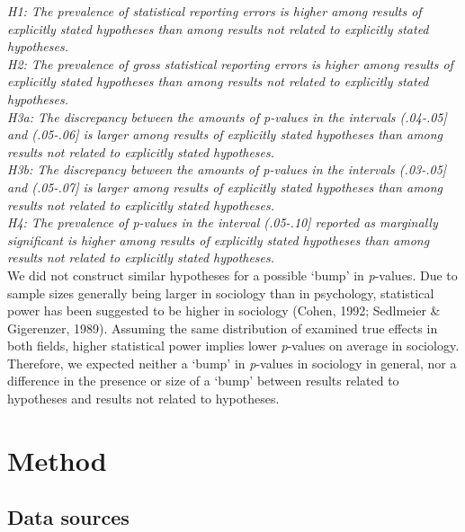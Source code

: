 \documentclass[
  12pt,
]{article}
\begin{document}
\emph{H1: The prevalence of statistical reporting errors is higher among
results of explicitly stated hypotheses than among results not related
to explicitly stated hypotheses.}\\

\emph{H2: The prevalence of gross statistical reporting errors is higher
among results of explicitly stated hypotheses than among results not
related to explicitly stated hypotheses.}\\

\emph{H3a: The discrepancy between the amounts of p-values in the
intervals (.04-.05{]} and (.05-.06{]} is larger among results of
explicitly stated hypotheses than among results not related to
explicitly stated hypotheses.}\\

\emph{H3b: The discrepancy between the amounts of p-values in the
intervals (.03-.05{]} and (.05-.07{]} is larger among results of
explicitly stated hypotheses than among results not related to
explicitly stated hypotheses.}\\

\emph{H4: The prevalence of p-values in the interval (.05-.10{]}
reported as marginally significant is higher among results of explicitly
stated hypotheses than among results not related to explicitly stated
hypotheses.}\\

We did not construct similar hypotheses for a possible `bump' in
\emph{p}-values. Due to sample sizes generally being larger in sociology
than in psychology, statistical power has been suggested to be higher in
sociology (Cohen, 1992; Sedlmeier \& Gigerenzer, 1989). Assuming the
same distribution of examined true effects in both fields, higher
statistical power implies lower \emph{p}-values on average in sociology.
Therefore, we expected neither a `bump' in \emph{p}-values in sociology
in general, nor a difference in the presence or size of a `bump' between
results related to hypotheses and results not related to hypotheses.

\vspace{2cm}

\hypertarget{method}{%
\section{Method}\label{method}}

\hypertarget{data-sources}{%
\subsection{Data sources}\label{data-sources}}
\end{document}

